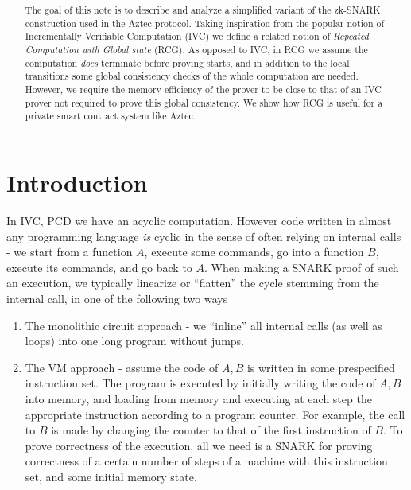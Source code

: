 \documentclass[11pt]{article} %
\title{ \papertitle \\[0.72cm]}
\author{}
\begin{document}
    \maketitle
\begin{abstract}
The goal of this note is to describe and analyze a simplified variant of the zk-SNARK construction used in the Aztec protocol.
Taking inspiration from the popular notion of Incrementally Verifiable Computation\cite{ivc} (IVC)
we define a related notion of \emph{Repeated Computation with Global state} (RCG). As opposed to IVC, in RCG we assume the computation \emph{does} terminate before proving starts, and in addition to the local transitions some global consistency checks of the whole computation are needed. However, we require the memory efficiency of the prover to be close to that of an IVC prover not required to prove this global consistency.
We show how RCG is useful for a private smart contract system like Aztec.
\end{abstract}
\section{Introduction}
In IVC, PCD \cite{ivc,pcd} we have an acyclic computation.
However code written in almost any programming language \emph{is} cyclic in the sense of often relying on internal calls - 
we start from a function $A$, execute some commands, go into a function $B$, execute its commands, and go back to $A$.
When making a SNARK proof of such an execution, we typically linearize or ``flatten'' the cycle stemming from  the internal call, in one of the following two ways
\begin{enumerate}
 \item The monolithic circuit approach - we ``inline'' all internal calls (as well as loops) into one long program without jumps.
 \item The VM approach - assume the code of $A,B$ is written in some prespecified instruction set. The program is executed by initially writing the code of $A,B$ into memory, and loading from memory and executing at each step the appropriate instruction according to a program counter. For example, the call to $B$ is made by changing the counter to that of the  first instruction of $B$. To prove correctness of the execution, all we need is a SNARK for proving correctness of a certain number of steps of a machine with this instruction set, and some initial memory state.
\end{enumerate}
\end{document}
